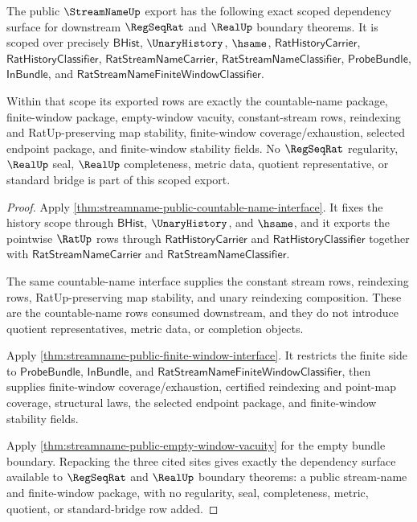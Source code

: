 \begin{theorem}
\label{thm:streamname-public-scoped-dependency-package}
The public $\StreamNameUp$ export has the following exact scoped dependency
surface for downstream $\RegSeqRat$ and $\RealUp$ boundary theorems.  It is
scoped over precisely
$\mathsf{BHist}$, $\UnaryHistory$, $\hsame$,
$\mathsf{RatHistoryCarrier}$, $\mathsf{RatHistoryClassifier}$,
$\mathsf{RatStreamNameCarrier}$, $\mathsf{RatStreamNameClassifier}$,
$\mathsf{ProbeBundle}$, $\mathsf{InBundle}$, and
$\mathsf{RatStreamNameFiniteWindowClassifier}$.

Within that scope its exported rows are exactly the countable-name package,
finite-window package, empty-window vacuity, constant-stream rows,
reindexing and RatUp-preserving map stability, finite-window
coverage/exhaustion, selected endpoint package, and finite-window stability
fields.  No $\RegSeqRat$ regularity, $\RealUp$ seal, $\RealUp$ completeness,
metric data, quotient representative, or standard bridge is part of this
scoped export.
\end{theorem}

\begin{proof}
Apply \autoref{thm:streamname-public-countable-name-interface}.  It fixes the
history scope through $\mathsf{BHist}$, $\UnaryHistory$, and $\hsame$, and it
exports the pointwise $\RatUp$ rows through $\mathsf{RatHistoryCarrier}$ and
$\mathsf{RatHistoryClassifier}$ together with
$\mathsf{RatStreamNameCarrier}$ and $\mathsf{RatStreamNameClassifier}$.

The same countable-name interface supplies the constant stream rows,
reindexing rows, RatUp-preserving map stability, and unary reindexing
composition.  These are the countable-name rows consumed downstream, and they
do not introduce quotient representatives, metric data, or completion
objects.

Apply \autoref{thm:streamname-public-finite-window-interface}.  It restricts
the finite side to $\mathsf{ProbeBundle}$, $\mathsf{InBundle}$, and
$\mathsf{RatStreamNameFiniteWindowClassifier}$, then supplies finite-window
coverage/exhaustion, certified reindexing and point-map coverage, structural
laws, the selected endpoint package, and finite-window stability fields.

Apply \autoref{thm:streamname-public-empty-window-vacuity} for the empty
bundle boundary.  Repacking the three cited sites gives exactly the dependency
surface available to $\RegSeqRat$ and $\RealUp$ boundary theorems: a public
stream-name and finite-window package, with no regularity, seal,
completeness, metric, quotient, or standard-bridge row added.
\end{proof}

